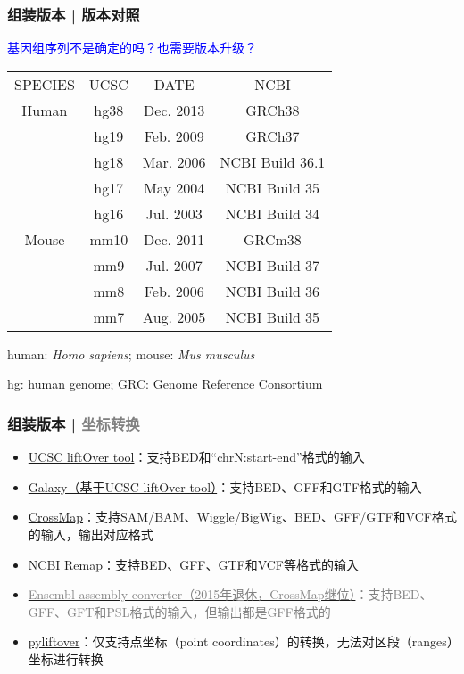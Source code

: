 \begin{frame}
  \frametitle{组装版本 | \alert{版本对照}}
  \begin{center}
    \textcolor{blue}{基因组序列不是确定的吗？也需要版本升级？}
  \end{center}
  \pause
  \begin{table}
    \centering
    \begin{tabular}{cccc}
      \hline
      \rowcolor{blue!50} SPECIES & UCSC & DATE & NCBI\\
      Human & hg38 & Dec. 2013 & GRCh38\\
       & hg19 & Feb. 2009 & GRCh37\\
       & hg18 & Mar. 2006 & NCBI Build 36.1\\
       & hg17 & May 2004 & NCBI Build 35\\
       & hg16 & Jul. 2003 & NCBI Build 34\\
      \hline
      Mouse & mm10 & Dec. 2011 & GRCm38\\
       & mm9 & Jul. 2007 & NCBI Build 37\\
       & mm8 & Feb. 2006 & NCBI Build 36\\
       & mm7 & Aug. 2005 & NCBI Build 35\\
      \hline
    \end{tabular}
  \end{table}
  \pause
  \begin{center}
    human: \textit{Homo sapiens}; mouse: \textit{\alert{M}us \alert{m}usculus}

    hg: \alert{h}uman \alert{g}enome; GRC: \alert{G}enome \alert{R}eference \alert{C}onsortium
  \end{center}
\end{frame}

\begin{frame}
  \frametitle{组装版本 | \textcolor{gray}{坐标转换}}
  \begin{itemize}
    \item \href{http://genome.ucsc.edu/cgi-bin/hgLiftOver}{UCSC liftOver tool}：支持BED和“chrN:start-end”格式的输入
    \item \href{https://usegalaxy.org/}{Galaxy（基于UCSC liftOver tool）}：支持BED、GFF和GTF格式的输入
    \item \href{http://crossmap.sourceforge.net/}{CrossMap}：支持SAM/BAM、Wiggle/BigWig、BED、GFF/GTF和VCF格式的输入，输出对应格式
    \item \href{http://www.ncbi.nlm.nih.gov/genome/tools/remap}{NCBI Remap}：支持BED、GFF、GTF和VCF等格式的输入
    \item \href{http://asia.ensembl.org/Homo\_sapiens/UserData/SelectFeatures}{\textcolor{gray}{Ensembl assembly converter（2015年退休，CrossMap继位）}}\textcolor{gray}{：支持BED、GFF、GFT和PSL格式的输入，但输出都是GFF格式的}
    \item \href{https://pypi.python.org/pypi/pyliftover}{pyliftover}：仅支持点坐标（point coordinates）的转换，无法对区段（ranges）坐标进行转换
  \end{itemize}
\end{frame}

